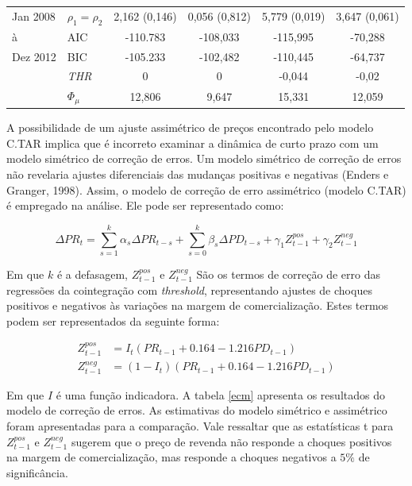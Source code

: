 \documentclass[
	article,			%
	12pt,				%
	openright,			%
	oneside,			%
	a4paper,			%
	english,			%
	brazil				%
	]{abntex2}
\begin{document}
\begin{table}[htbp]
\begin{tabularx}{\textwidth}{X||l|c|c|c|c}
		Jan 2008	& $\rho_{1}=\rho_{2}$	&   2,162 (0,146)	 & 0,056 (0,812)	&  5,779 (0,019)      & 3,647 (0,061)         \\  		
  		à			& 	AIC 				&   -110.783   		 & -108,033		    & -115,995		 & -70,288     \\
		Dez 2012		& 	BIC 					&  -105.233			 &  -102,482  		   &	-110,445 	 & -64,737	 \\
					& \textit{THR}			&  0   				 & 0    			    & -0,044  			 & -0,02         \\  	
    					& $\Phi_{\mu}$ 			&  12,806			 &  9,647 		    & 15,331		       & 12,059               \\    \hline         
 \bottomrule
    \end{tabularx}
  \label{coint}
\end{table}


A possibilidade de um ajuste assimétrico de preços encontrado pelo modelo C.TAR implica que é incorreto examinar a dinâmica de curto prazo com um modelo simétrico de correção de erros. Um modelo simétrico de correção de erros não revelaria ajustes diferenciais das mudanças positivas e negativas (Enders e Granger, 1998). Assim, o modelo de correção de erro assimétrico (modelo C.TAR) é empregado na análise. Ele pode ser representado como:

\begin{equation}
\Delta PR_{t}=\sum_{s=1}^{k}\alpha_{s}\Delta PR_{t-s}+\sum_{s=0}^{k}\beta_{s}\Delta  PD_{t-s}+\gamma_{1}Z_{t-1}^{pos}+\gamma_{2}Z_{t-1}^{neg}
\end{equation}

Em que $k$ é a defasagem, $Z_{t-1}^{pos}$ e $Z_{t-1}^{neg}$ São os termos de correção de erro das regressões da cointegração com \textit{threshold}, representando ajustes de choques positivos e negativos às variações na margem de comercialização. Estes termos podem ser representados da seguinte forma:

\begin{align*}
Z_{t-1}^{pos}&=I_{t}\left (PR_{t-1}+0.164-1.216PD_{t-1} \right )\nonumber \\
Z_{t-1}^{neg}&=\left (1-I_{t}\right )\left (PR_{t-1}+0.164-1.216PD_{t-1} \right ) \nonumber
\end{align*}

Em que $I$ é uma função indicadora. A tabela \ref{ecm} apresenta os resultados do modelo de correção de erros. As estimativas do modelo simétrico e assimétrico foram apresentadas para a comparação. Vale ressaltar que as estatísticas t para $Z_{t-1}^{pos}$ e $Z_{t-1}^{neg}$ sugerem que o preço de revenda não responde a choques positivos na margem de comercialização, mas responde a choques negativos a $5\%$ de significância.
\end{document}
